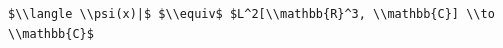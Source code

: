 \documentclass[border=10pt]{standalone}
\begin{document}
\begin{lstlisting}
$\\langle \\psi(x)|$ $\\equiv$ $L^2[\\mathbb{R}^3, \\mathbb{C}] \\to \\mathbb{C}$
\end{lstlisting}
\end{document}
